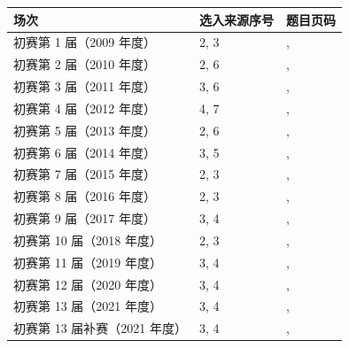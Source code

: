 \documentclass[12pt,fontset=fandol]{ctexart}
\begin{document}
\begin{longtable}{p{}p{}p{}}

\toprule 场次 & 选入来源序号 & 题目页码\\\midrule\endhead

初赛第 1 届（2009 年度） & 2, 3 & \pageref{ex:pre01-math:2}, \pageref{ex:pre01-math:3}\\

初赛第 2 届（2010 年度） & 2, 6 & \pageref{ex:pre02-math:2}, \pageref{ex:pre02-math:6}\\

初赛第 3 届（2011 年度） & 3, 6 & \pageref{ex:pre03-math:3}, \pageref{ex:pre03-math:6}\\

初赛第 4 届（2012 年度） & 4, 7 & \pageref{ex:pre04-math:4}, \pageref{ex:pre04-math:7}\\

初赛第 5 届（2013 年度） & 2, 6 & \pageref{ex:pre05-math:2}, \pageref{ex:pre05-math:6}\\

初赛第 6 届（2014 年度） & 3, 5 & \pageref{ex:pre06-math:3}, \pageref{ex:pre06-math:5}\\

初赛第 7 届（2015 年度） & 2, 3 & \pageref{ex:pre07-math:2}, \pageref{ex:pre07-math:3}\\

初赛第 8 届（2016 年度） & 2, 3 & \pageref{ex:pre08-math:2}, \pageref{ex:pre08-math:3}\\

初赛第 9 届（2017 年度） & 3, 4 & \pageref{ex:pre09-math:3}, \pageref{ex:pre09-math:4}\\

初赛第 10 届（2018 年度） & 2, 3 & \pageref{ex:pre10-math:2}, \pageref{ex:pre10-math:3}\\

初赛第 11 届（2019 年度） & 3, 4 & \pageref{ex:ch10-11th-A:3}, \pageref{ex:ch10-11th-A:4}\\

初赛第 12 届（2020 年度） & 3, 4 & \pageref{ex:ch09-12th-A:3}, \pageref{ex:ch09-12th-A:4}\\

初赛第 13 届（2021 年度） & 3, 4 & \pageref{ex:ch07-13th-A:3}, \pageref{ex:ch07-13th-A:4}\\

初赛第 13 届补赛（2021 年度） & 3, 4 & \pageref{ex:ch08-13th-A-makeup:3}, \pageref{ex:ch08-13th-A-makeup:4}\\


\end{longtable}
\end{document}
